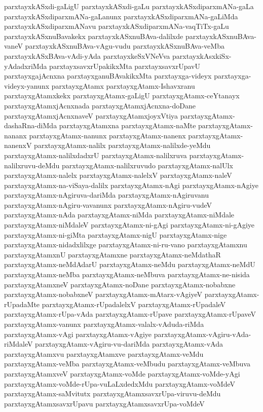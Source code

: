 {parxtayxkASxdi-gaLigU
parxtayxkASxdi-gaLu
parxtayxkASxdiparxmANa-gaLa
parxtayxkASxdiparxmANa-gaLanunx
parxtayxkASxdiparxmANa-gaLiMda
parxtayxkASxdiparxmANavu
parxtayxkASxdiparxmANa-vaqTiTx-gaLu
parxtayxkASxnuBavakekx
parxtayxkASxnuBAva-dalilxde
parxtayxkASxnuBAva-vaneV
parxtayxkASxnuBAva-vAgu-vudu
parxtayxkASxnuBAva-veMba
parxtayxkASxBAva-vAdi-yAda
parxtayxkeSxVNeVva
parxtayxkAsxkiSx-yAdadxriMda
parxtayxsavxrUpakikxMta
parxtayxsavxrUpavU
parxtayxgajAcnxna
parxtayxganuBAvakikxMta
parxtayxga-videyx
parxtayxga-videyx-yanunx
parxtayxgAtamx
parxtayxgAtamx-Ishavxranu
parxtayxgAtamxkekx
parxtayxgAtamx-gaLigU
parxtayxgAtamx-ceYtanayx
parxtayxgAtamxjAcnxnada
parxtayxgAtamxjAcnxna-doDane
parxtayxgAtamxjAcnxnaveV
parxtayxgAtamxjoyxVtiya
parxtayxgAtamx-dashaRna-diMda
parxtayxgAtamxna
parxtayxgAtamx-naMte
parxtayxgAtamx-nananx
parxtayxgAtamx-nanunx
parxtayxgAtamx-nanenx
parxtayxgAtamx-nanenxV
parxtayxgAtamx-nalilx
parxtayxgAtamx-nalilxde-yeMdu
parxtayxgAtamx-nalilxdadxrU
parxtayxgAtamx-nalilxruva
parxtayxgAtamx-nalilxruvu-deMdu
parxtayxgAtamx-nalilxruvudo
parxtayxgAtamx-nalUlx
parxtayxgAtamx-nalelx
parxtayxgAtamx-nalelxV
parxtayxgAtamx-naleV
parxtayxgAtamx-na-viSaya-dalilx
parxtayxgAtamx-nAgi
parxtayxgAtamx-nAgiye
parxtayxgAtamx-nAgiruva-dariMda
parxtayxgAtamx-nAgiruvanu
parxtayxgAtamx-nAgiru-vavanunx
parxtayxgAtamx-nAgiru-vudeV
parxtayxgAtamx-nAda
parxtayxgAtamx-niMda
parxtayxgAtamx-niMdale
parxtayxgAtamx-niMdaleV
parxtayxgAtamx-ni-gAgi
parxtayxgAtamx-ni-gAgiye
parxtayxgAtamx-ni-giMta
parxtayxgAtamx-nigU
parxtayxgAtamx-nige
parxtayxgAtamx-nidadxlilxge
parxtayxgAtamx-ni-ru-vano
parxtayxgAtamxnu
parxtayxgAtamxnU
parxtayxgAtamxne
parxtayxgAtamx-neMdathaR
parxtayxgAtamx-neMdAdarU
parxtayxgAtamx-neMdu
parxtayxgAtamx-neMdU
parxtayxgAtamx-neMba
parxtayxgAtamx-neMbuva
parxtayxgAtamx-ne-nisida
parxtayxgAtamxneV
parxtayxgAtamx-noDane
parxtayxgAtamx-nobabxne
parxtayxgAtamx-nobabxneV
parxtayxgAtamx-mAtarx-vAgiyeV
parxtayxgAtamx-rUpadaMte
parxtayxgAtamx-rUpadalelxV
parxtayxgAtamx-rUpadaleV
parxtayxgAtamx-rUpa-vAda
parxtayxgAtamx-rUpave
parxtayxgAtamx-rUpaveV
parxtayxgAtamx-vanunx
parxtayxgAtamx-valalx-vAduda-riMda
parxtayxgAtamx-vAgi
parxtayxgAtamx-vAgiye
parxtayxgAtamx-vAgiru-vAda-riMdaleV
parxtayxgAtamx-vAgiru-vu-dariMda
parxtayxgAtamx-vAda
parxtayxgAtamxvu
parxtayxgAtamxve
parxtayxgAtamx-veMdu
parxtayxgAtamx-veMba
parxtayxgAtamx-veMbudu
parxtayxgAtamx-veMbuva
parxtayxgAtamxveV
parxtayxgAtamx-voMde
parxtayxgAtamx-voMde-yAgi
parxtayxgAtamx-voMde-rUpa-vuLaLxdedxMdu
parxtayxgAtamx-voMdeV
parxtayxgAtamx-saMvitutx
parxtayxgAtamxsavxrUpa-viruvu-deMdu
parxtayxgAtamxsavxrUpavu
parxtayxgAtamxsavxrUpa-voMdeV
}
